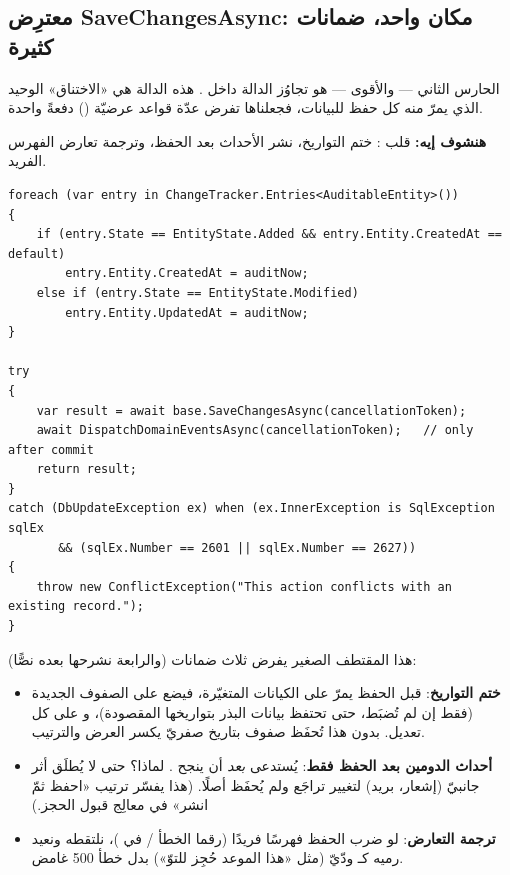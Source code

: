 \subsection{معترِض SaveChangesAsync: مكان واحد، ضمانات كثيرة}

الحارس الثاني — والأقوى — هو تجاوُز الدالة  داخل .
هذه الدالة هي «الاختناق» الوحيد الذي يمرّ منه كل حفظ للبيانات، فجعلناها تفرض عدّة قواعد
عرضيّة () دفعةً واحدة.

\textbf{هنشوف إيه:} قلب : ختم التواريخ، نشر الأحداث بعد الحفظ،
وترجمة تعارض الفهرس الفريد.

\begin{english}
\begin{lstlisting}[language={[Sharp]C}]
foreach (var entry in ChangeTracker.Entries<AuditableEntity>())
{
    if (entry.State == EntityState.Added && entry.Entity.CreatedAt == default)
        entry.Entity.CreatedAt = auditNow;
    else if (entry.State == EntityState.Modified)
        entry.Entity.UpdatedAt = auditNow;
}

try
{
    var result = await base.SaveChangesAsync(cancellationToken);
    await DispatchDomainEventsAsync(cancellationToken);   // only after commit
    return result;
}
catch (DbUpdateException ex) when (ex.InnerException is SqlException sqlEx
       && (sqlEx.Number == 2601 || sqlEx.Number == 2627))
{
    throw new ConflictException("This action conflicts with an existing record.");
}
\end{lstlisting}
\end{english}

هذا المقتطف الصغير يفرض ثلاث ضمانات (والرابعة نشرحها بعده نصًّا):
\begin{itemize}
\item \textbf{ختم التواريخ}: قبل الحفظ يمرّ على الكيانات المتغيّرة، فيضع 
  على الصفوف الجديدة (فقط إن لم تُضبَط، حتى تحتفظ بيانات البذر بتواريخها المقصودة)،
  و على كل تعديل. بدون هذا تُحفَظ صفوف بتاريخ صفريّ يكسر العرض والترتيب.
\item \textbf{أحداث الدومين بعد الحفظ فقط}: يُستدعى 
  \emph{بعد} أن ينجح . لماذا؟ حتى لا يُطلَق أثر جانبيّ
  (إشعار، بريد) لتغيير تراجَع ولم يُحفَظ أصلًا. (هذا يفسّر ترتيب «احفظ ثمّ انشر» في معالِج
  قبول الحجز.)
\item \textbf{ترجمة التعارض}: لو ضرب الحفظ فهرسًا فريدًا (رقما الخطأ /
  في )، نلتقطه ونعيد رميه كـ  ودّيّ (مثل «هذا
  الموعد حُجِز للتوّ») بدل خطأ 500 غامض.
\end{itemize}

